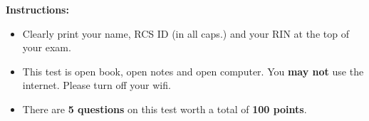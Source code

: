 \documentclass[10pt]{article}
\begin{document}
\vspace*{.45in} 

{\large\bf Instructions:}
\begin{itemize}
\item Clearly print your name, RCS ID (in all caps.) and your RIN at the top of your exam.
\item This test is open book, open notes and open computer. You \textbf{may not} use the internet. Please turn off your wifi.
\item There are \textbf{5 questions} on this test worth a total of
  \textbf{100 points}.
\end{itemize}


\newpage


\fi
\end{document}

